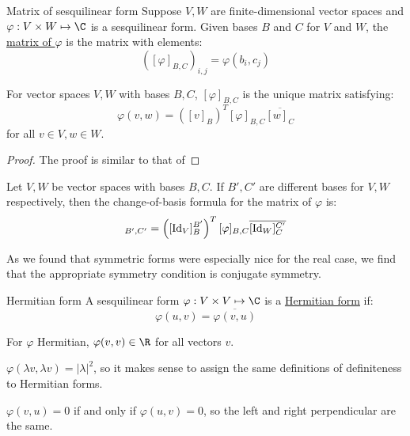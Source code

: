 \documentclass[../Main.tex]{subfiles}
\begin{document}
\begin{definition}{Matrix of sesquilinear form}
    Suppose $V, W$ are finite-dimensional vector spaces and $\varphi : V \times W \mapsto \C$ is a sesquilinear form. Given bases $B$ and $C$ for $V$ and $W$, the \underline{matrix of $\varphi$} is the matrix with elements:
    \begin{equation*}
        ([\varphi]_{B, C})_{i, j} = \varphi(b_i, c_j)
    \end{equation*}
\end{definition}
\begin{proposition}
    For vector spaces $V, W$ with bases $B, C$, $[\varphi]_{B, C}$ is the unique matrix satisfying:
    \begin{equation}
        \varphi(v, w) = \left([v]_B\right)^T [\varphi]_{B, C} \overline{[w]_C}
        \label{eqnCFMatProduct}
    \end{equation}
    for all $v \in V, w \in W$.
    \label{propCFMatProducts}
\end{proposition}
\begin{proof}
    The proof is similar to that of 
\end{proof}
\begin{corollary}
    Let $V, W$ be vector spaces with bases $B, C$. If $B', C'$ are different bases for $V, W$ respectively, then the change-of-basis formula for the matrix of $\varphi$ is:
    \begin{equation*}
        [\varphi]_{B', C'} = \left([\Id_V]_B^{B'}\right)^T [\varphi]_{B, C} \overline{[\Id_W]_{C}^{C'}}
    \end{equation*}
    \label{corCFChangeBasis}
\end{corollary}
As we found that symmetric forms were especially nice for the real case, we find that the appropriate symmetry condition is conjugate symmetry.
\begin{definition}{Hermitian form}
    A sesquilinear form $\varphi : V \times V \mapsto \C$ is a \underline{Hermitian form} if:
    \begin{equation*}
        \varphi(u, v) = \overline{\varphi(v, u)}
    \end{equation*}
\end{definition}
\begin{remarks}
    \item For $\varphi$ Hermitian, $\varphi(v, v) \in \R$ for all vectors $v$.
    \item $\varphi(\lambda v, \lambda v) = |\lambda|^2$, so it makes sense to assign the same definitions of definiteness to Hermitian forms.
    \item $\varphi(v, u) = 0$ if and only if $\varphi(u, v) = 0$, so the left and right perpendicular are the same.
\end{remarks}
\end{document}
